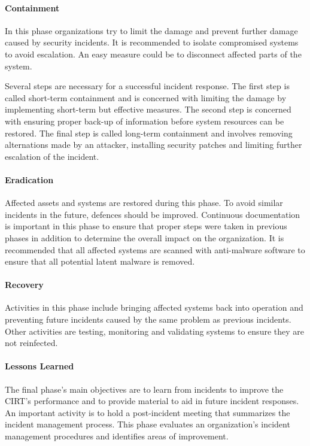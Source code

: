 \paragraph{Containment} 
In this phase organizations try to limit the damage and prevent further damage caused by security incidents. It is recommended to isolate compromised systems to avoid escalation. An easy measure could be to disconnect affected parts of the system. 

Several steps are necessary for a successful incident response. The first step is called short-term containment and is concerned with limiting the damage by implementing short-term but effective measures. The second step is concerned with ensuring proper back-up of information before system resources can be restored. The final step is called long-term containment and involves removing alternations made by an attacker, installing security patches and limiting further escalation of the incident.

\paragraph{Eradication} 
Affected assets and systems are restored during this phase. To avoid similar incidents in the future, defences should be improved. Continuous documentation is important in this phase to ensure that proper steps were taken in previous phases in addition to determine the overall impact on the organization. It is recommended that all affected systems are scanned with anti-malware software to ensure that all potential latent malware is removed. 

\paragraph{Recovery} 
Activities in this phase include bringing affected systems back into operation and preventing future incidents caused by the same problem as previous incidents. Other activities are testing, monitoring and validating systems to ensure they are not reinfected. 

\paragraph{Lessons Learned} 
The final phase's main objectives are to learn from incidents to improve the CIRT's performance and to provide material to aid in future incident responses. An important activity is to hold a post-incident meeting that summarizes the incident management process. This phase evaluates an organization's incident management procedures and identifies areas of improvement.